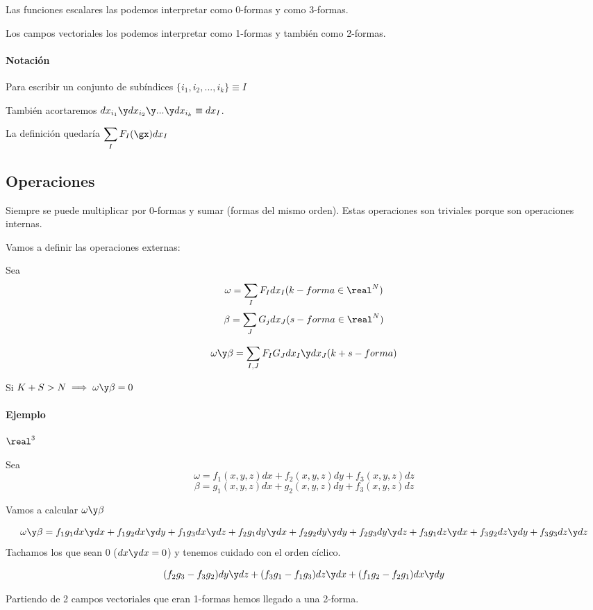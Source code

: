 \obs Las funciones escalares las podemos interpretar como 0-formas y como 3-formas.

Los campos vectoriales los podemos interpretar como 1-formas y también como 2-formas.

\paragraph{Notación}
Para escribir un conjunto de subíndices $\{i_1,i_2,...,i_k\} \equiv I$

También acortaremos  $dx_{i_1} \y dx_{i_2} \y ... \y dx_{i_k} \equiv dx_I$. 

La definición quedaría $\displaystyle \sum_I F_I(\gx)dx_I$

\subsection{Operaciones}
Siempre se puede multiplicar por 0-formas y sumar (formas del mismo orden). Estas operaciones son triviales porque son operaciones internas.

Vamos a definir las operaciones externas:

\begin{defn}
Sea \[\omega = \sum_I F_I dx_I (k-forma\in\real^N)\]
\[\beta = \sum_J G_j dx_J (s-forma\in\real^N)\]

\[\omega\y\beta = \sum_{I,J} F_IG_J dx_I\y dx_J (k+s-forma)\]
\end{defn}

\obs Si $K+S>N \implies \omega\y\beta=0$


\paragraph{Ejemplo} $\real^3$

Sea \[\omega = f_1(x,y,z)dx + f_2(x,y,z)dy + f_3(x,y,z) dz\]
\[\beta= g_1(x,y,z)dx + g_2 (x,y,z) dy + f_3 (x,y,z) dz\]

Vamos a calcular $\omega\y\beta$

\[
\omega\y\beta  = f_1g_1dx\y dx + f_1g_2dx\y dy + f_1g_3dx\y dz + f_2g_1dy\y dx + f_2g_2dy\y dy + f_2g_3dy\y dz+ f_3g_1dz\y dx+f_3g_2dz\y dy+f_3g_3dz\y dz
\]
Tachamos los que sean 0 ($dx\y dx = 0$) y tenemos cuidado con el orden cíclico.

\[
(f_2g_3-f_3g_2)dy\y dz + (f_3g_1-f_1g_3)dz\y dx + (f_1g_2 - f_2g_1) dx \y dy
\]

Partiendo de 2 campos vectoriales que eran 1-formas hemos llegado a una 2-forma. 

